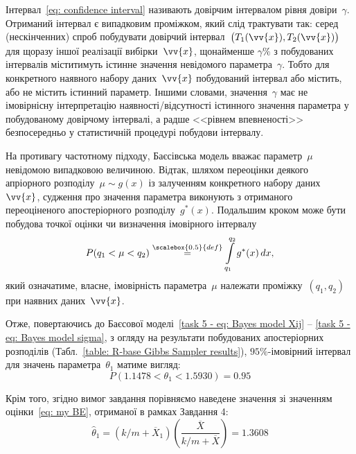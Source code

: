 Інтервал~\eqref{eq: confidence interval} називають довірчим інтервалом рівня довіри~$\gamma$. Отриманий інтервал є випадковим проміжком, який слід трактувати так: серед (нескінченних) спроб побудувати довірчий інтервал~$\bigl( T_1(\vv{x}),T_2(\vv{x}) \bigr)$ для щоразу іншої реалізації вибірки~$\vv{x}$, щонайменше $\gamma\%$ з побудованих інтервалів міститимуть істинне значення невідомого параметра~$\gamma$. Тобто для конкретного наявного набору даних~$\vv{x}$ побудований інтервал або містить, або не містить істинний параметр. Іншими словами, значення~$\gamma$ має не імовірнісну інтерпретацію наявності/відсутності істинного значення параметра у побудованому довірчому інтервалі, а радше <<рівнем впевненості>> безпосередньо у статистичній процедурі побудови інтервалу.

На противагу частотному підходу, Баєсівська модель вважає параметр~$\mu$ невідомою випадковою величиною. Відтак, шляхом переоцінки деякого апріорного розподілу~$\mu \sim g(x)$ із залученням конкретного набору даних~$\vv{x}$, судження про значення параметра виконують з отриманого переоціненого апостеріорного розподілу~$g^{*}(x)$. Подальшим кроком може бути побудова точкої оцінки чи визначення імовірного інтервалу
\begin{equation}\label{eq: credible interval}
    P(q_1 < \mu < q_2) \overset{\scalebox{0.5}{def}}{=} \int\limits_{q_1}^{q_2} g^{*}(x)\, dx,
\end{equation}
який означатиме, власне, імовірність параметра~$\mu$ належати проміжку~$(q_1,q_2)$ при наявних даних~$\vv{x}$. 

Отже, повертаючись до Баєсової моделі~\eqref{task 5 - eq: Bayes model Xij} -- \eqref{task 5 - eq: Bayes model sigma}, з огляду на результати побудованих апостеріорних розподілів (Табл.~\ref{table: R-base Gibbs Sampler results}), $95\%$-імовірний інтервал для значень параметра~$\theta_1$ матиме вигляд:
\begin{equation}\label{eq: theta1 R-base credible interval}
    P(1.1478 < \theta_1 < 1.5930) = 0.95
\end{equation}

Крім того, згідно вимог завдання порівняємо наведене значення зі значенням оцінки~\eqref{eq: my BE}, отриманої в рамках Завдання 4:
\begin{equation}\label{eq: R-base theta star estimation}
    \widehat{\theta}_1 = \left( k/m+\overline{X}_1 \right)\left( \frac{\overline{X}}{k/m+\overline{X}} \right) = 1.3608
\end{equation}

